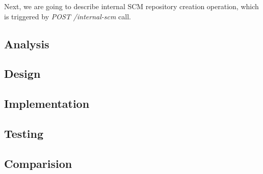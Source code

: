 \documentclass[../main.tex]{subfiles}
\begin{document}
Next, we are going to describe internal SCM repository creation operation, which is triggered by \textit{POST /internal-scm} call.

\subsection{Analysis}


\subsection{Design}


\subsection{Implementation}


\subsection{Testing}


\subsection{Comparision}

\end{document}
